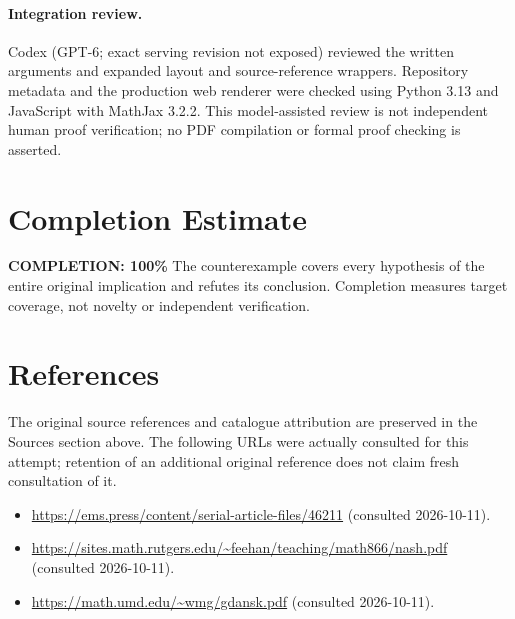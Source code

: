 \documentclass[11pt]{article}
\begin{document}
\paragraph{Integration review.} Codex (GPT-6; exact serving revision not exposed) reviewed the written arguments and expanded layout and source-reference wrappers. Repository metadata and the production web renderer were checked using Python 3.13 and JavaScript with MathJax 3.2.2. This model-assisted review is not independent human proof verification; no PDF compilation or formal proof checking is asserted.

\section{Completion Estimate}
\noindent\textbf{COMPLETION: 100\%}
The counterexample covers every hypothesis of the entire original implication and
refutes its conclusion. Completion measures target coverage, not novelty or
independent verification.
\section{References}
The original source references and catalogue attribution are preserved in the
Sources section above. The following URLs were actually consulted for this attempt;
retention of an additional original reference does not claim fresh consultation of it.
\begin{itemize}
\item \url{https://ems.press/content/serial-article-files/46211} (consulted 2026-10-11). 
\item \url{https://sites.math.rutgers.edu/~feehan/teaching/math866/nash.pdf} (consulted 2026-10-11). 
\item \url{https://math.umd.edu/~wmg/gdansk.pdf} (consulted 2026-10-11). 
\end{itemize}
\end{document}
